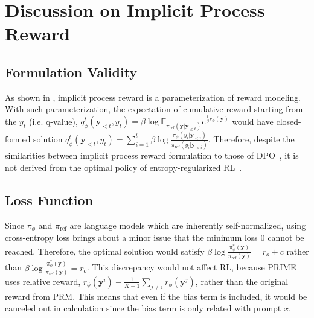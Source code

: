 


\section{Discussion on Implicit Process Reward}
\label{sec:app_iprm}
\subsection{Formulation Validity}
As shown in \citet{yuan2024freeprocessrewardsprocess}, implicit process reward is a parameterization of reward modeling. 
With such parameterization, the expectation of cumulative reward starting from the $y_t$ (i.e. q-value), $q_\phi^t(\mathbf{y}_{<t}, y_t) = \beta \log \mathbb{E}_{\pi_\text{ref}(\mathbf{y}|\mathbf{y}_{\leq t})} e^{\frac{1}{\beta}r_\phi(\mathbf{y})}$ would have closed-formed solution $q_\phi^t(\mathbf{y}_{<t}, y_t)= \sum_{i=1}^{t} \beta \log \frac{\pi_\phi(y_{i}|\mathbf{y}_{<i})}{\pi_\text{ref}(y_{i}|\mathbf{y}_{<i})}$.
Therefore, despite the similarities between implicit process reward formulation to those of DPO~\citep{rafailov2024direct,rafailov2024r}, it is not derived from the optimal policy of entropy-regularized RL~\citep{DBLP:conf/aaai/ZiebartMBD08, DBLP:conf/icml/HaarnojaTAL17}. 

\subsection{Loss Function}
Since $\pi_\phi$ and $\pi_\text{ref}$ are language models which are inherently self-normalized, using cross-entropy loss brings about a minor issue that the minimum loss 0 cannot be reached. Therefore, the optimal solution would satisfy $\beta \log \frac{\pi_\phi^*(\mathbf{y})}{\pi_\text{ref}(\mathbf{y})}=r_o+c$ rather than $\beta \log \frac{\pi_\phi^*(\mathbf{y})}{\pi_\text{ref}(\mathbf{y})}=r_o$. This discrepancy would not affect RL, because PRIME uses relative reward, $r_\phi\left(\mathbf{y}^i\right)-\frac{1}{K-1} \sum_{j \neq i} r_\phi\left(\mathbf{y}^j\right)$, rather than the original reward from PRM. This means that even if the bias term is included, it would be canceled out in calculation since the bias term is only related with prompt $x$.

